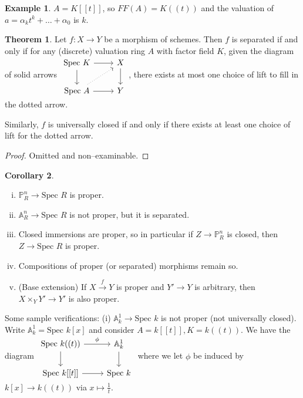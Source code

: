\documentclass{article}
\theoremstyle{definition}
\newtheorem{theorem}{Theorem}[section]
\newtheorem{cor}[theorem]{Corollary}
\newtheorem{example}{Example}[section]
\begin{document}
\begin{example}
    $A = K[[t]]$, so $FF(A)=K((t))$ and the valuation of $a = \alpha_k t^k + \ldots + \alpha_0$ is $k$.
\end{example}
\begin{theorem}
    Let $f: X \to Y$ be a morphism of schemes. Then $f$ is separated if and only if for any (discrete) valuation ring $A$ with factor field $K$, given the diagram of solid arrows $\begin{tikzcd}[]
        \text{Spec }K & X\\
        \text{Spec }A & Y
        \arrow["", from=1-2, to=2-2]
        \arrow["",from=1-1, to=2-1]
        \arrow["", from=2-1, to=2-2]
        \arrow["", from=1-1, to=1-2]
        \arrow["", from=2-1, to=1-2, dotted]
    \end{tikzcd}$, there exists at most one choice of lift to fill in the dotted arrow.
    \vspace{1mm}
     
    Similarly, $f$ is universally closed if and only if there exists at least one choice of lift for the dotted arrow.
\end{theorem}
\begin{proof}
    Omitted and non--examinable.
\end{proof}
\begin{cor}
    \begin{enumerate}[(i)]
        \item $\mathbb{P}^n_R \to \text{Spec }R$ is proper.
        \item $\mathbb{A}^n_R \to \text{Spec }R$ is not proper, but it is separated.
        \item Closed immersions are proper, so in particular if $Z \to \mathbb{P}^n_R$ is closed, then $Z \to \text{Spec }R$ is proper.
        \item Compositions of proper (or separated) morphisms remain so.
        \item (Base extension) If $X \stackrel{f}{\to} Y$ is proper and $Y' \to Y$ is arbitrary, then $X \times_{Y} Y' \to Y'$ is also proper.
    \end{enumerate}
\end{cor}

Some sample verifications: (i) $\mathbb{A}^1_k \to \text{Spec }k$ is not proper (not universally closed). Write $\mathbb{A}^1_k = \text{Spec }k[x]$ and consider $A=k[[t]], K=k((t))$. We have the diagram $\begin{tikzcd}[]
    \text{Spec }k((t)) & \mathbb{A}^1_k\\
    \text{Spec }k[[t]] & \text{Spec }k
    \arrow["", from=1-2, to=2-2]
    \arrow["",from=1-1, to=2-1]
    \arrow["", from=2-1, to=2-2]
    \arrow["\phi", from=1-1, to=1-2]
\end{tikzcd}$ where we let $\phi$ be induced by $k[x] \to k((t))$ via $x \mapsto \frac{1}{t}$.
\end{document}
